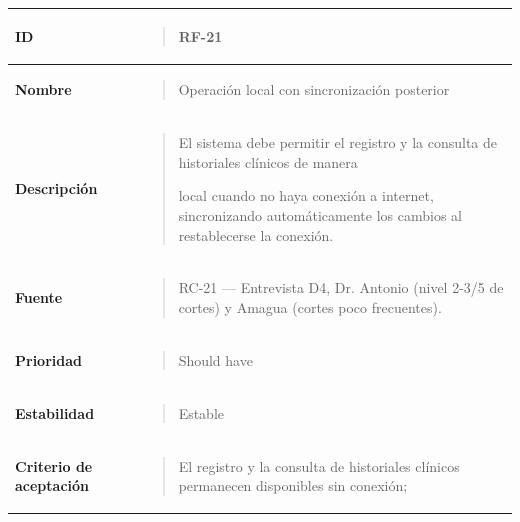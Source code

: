 \documentclass[
]{article}
\newcounter{none} %
\begin{document}
{\def\LTcaptype{none} %
\begin{longtable}[]{@{}
  >{\raggedright\arraybackslash}p{}
  >{\raggedright\arraybackslash}p{}@{}}
\toprule\noalign{}
\begin{minipage}[b]{\linewidth}\raggedright
\textbf{ID}
\end{minipage} & \begin{minipage}[b]{\linewidth}\raggedright
\begin{quote}
RF-21
\end{quote}
\end{minipage} \\
\midrule\noalign{}
\endhead
\bottomrule\noalign{}
\endlastfoot
\textbf{Nombre} & \begin{minipage}[t]{\linewidth}\raggedright
\begin{quote}
Operación local con sincronización posterior
\end{quote}
\end{minipage} \\
\textbf{Descripción} & \begin{minipage}[t]{\linewidth}\raggedright
\begin{quote}
El sistema debe permitir el registro y la consulta de historiales
clínicos de manera

local cuando no haya conexión a internet, sincronizando automáticamente
los cambios al restablecerse la conexión.
\end{quote}
\end{minipage} \\
\textbf{Fuente} & \begin{minipage}[t]{\linewidth}\raggedright
\begin{quote}
RC-21 --- Entrevista D4, Dr. Antonio (nivel 2-3/5 de cortes) y Amagua
(cortes poco frecuentes).
\end{quote}
\end{minipage} \\
\textbf{Prioridad} & \begin{minipage}[t]{\linewidth}\raggedright
\begin{quote}
Should have
\end{quote}
\end{minipage} \\
\textbf{Estabilidad} & \begin{minipage}[t]{\linewidth}\raggedright
\begin{quote}
Estable
\end{quote}
\end{minipage} \\
\textbf{Criterio de aceptación} &
\begin{minipage}[t]{\linewidth}\raggedright
\begin{quote}
El registro y la consulta de historiales clínicos permanecen disponibles
sin conexión;


\end{quote}
\end{minipage}
\end{longtable}}
\end{document}
